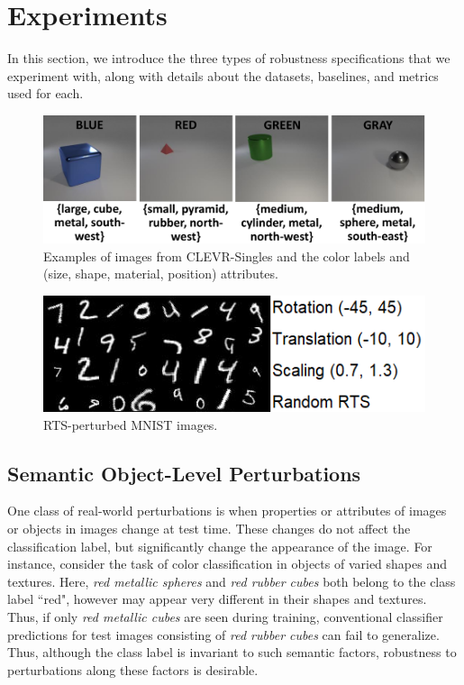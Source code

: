 \section{Experiments}
In this section, we introduce the three types of robustness specifications that we experiment with, along with details about the datasets, baselines, and metrics used for each.

\begin{figure}[t]
    \centering
    \includegraphics[width=0.99\linewidth]{agat/images/clevr_singles.pdf}
    \caption{Examples of images from CLEVR-Singles and the color labels and (size, shape, material, position) attributes.}
    \label{fig:clevr_singles}
\end{figure}



\begin{figure}[t]
    \centering
    \includegraphics[width=0.75\linewidth]{agat/images/mnist_rts_bigfont.png}
    \caption{
    RTS-perturbed MNIST images.
    }
    \label{fig:mnist_rts}
\end{figure}


\subsection{Semantic Object-Level Perturbations}
One class of real-world perturbations is when properties or attributes of images or objects in images change at test time.
These changes do not affect the classification label, but significantly change the appearance of the image.
For instance, consider the task of color classification in objects of varied shapes and textures. 
Here, \textit{red metallic spheres} and \textit{red rubber cubes} both belong to the class label ``red", however may appear very different in their shapes and textures. 
Thus, if only \textit{red metallic cubes} are seen during training, conventional classifier predictions for test images consisting of \textit{red rubber cubes} can fail to generalize. 
Thus, although the class label is invariant to such semantic factors, robustness to perturbations along these factors is desirable.

